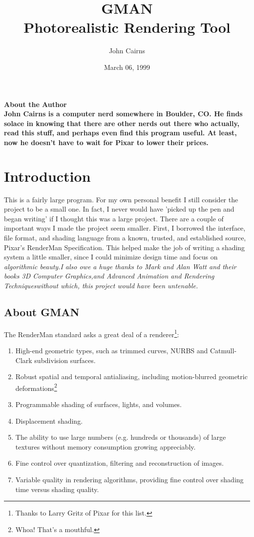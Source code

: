 \documentclass{book}	%
\title{GMAN\\
Photorealistic Rendering Tool}
\author { John Cairns }
\date   { March 06, 1999 }
\begin{document}
\maketitle
\eject
\vfill
\vbox{
\hsize 3in
\bf About the Author\rm\\
John Cairns is a computer nerd somewhere in Boulder, CO.   He finds
solace in knowing that there are other nerds out there who actually,
read this stuff, and perhaps even find this program useful.   At least,
now he doesn't have to wait for Pixar to lower their prices.
}

\tableofcontents
\chapter{Introduction}


This is a fairly large program.  For my own personal benefit I still
consider the project to be a small one.   In fact, I never would have
'picked up the pen and began writing' if I thought this was a large
project.   There are a couple of important ways I made the project seem
smaller.  First, I borrowed the interface, file format, and shading
language from a known, trusted, and established source, Pixar's
RenderMan Specification.
This helped make the job of writing a shading system a little
smaller, since I could minimize design time and focus on
\em algorithmic beauty.\rm   I also owe a huge thanks to Mark and Alan
Watt and their books \em 3D Computer Graphics,\rm and Advanced
Animation and Rendering Techniques\rm without which, this project
would have been untenable.

\section{About GMAN}
The RenderMan standard asks a great deal of a renderer\footnote{Thanks to
Larry Gritz of Pixar for this list.}:

\begin{enumerate}
\item{High-end geometric types, such as trimmed curves, NURBS and
      Catmull-Clark subdivision surfaces.}
\item{Robust spatial and temporal antialiasing, 
      including motion-blurred geometric deformations\footnote{Whoa!
That's a mouthful.}}
\item{Programmable shading of surfaces, lights, and volumes.}
\item{Displacement shading.}
\item{The ability to use large numbers (e.g. hundreds or thousands)
      of large textures without memory consumption growing appreciably.}
\item{Fine control over quantization, filtering and reconstruction of
      images.}
\item{Variable quality in rendering algorithms, providing fine
control over shading time versus shading quality.}
\end{enumerate}
\end{document}
